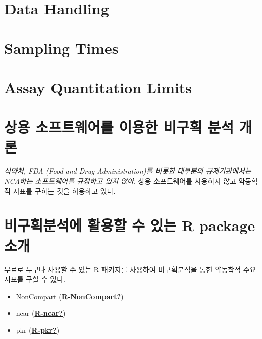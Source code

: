 \documentclass[
  11pt,
  krantz2, a4paper, twoside]{krantz}
\providecommand{\tightlist}{%
  \setlength{\itemsep}{0pt}\setlength{\parskip}{0pt}}
\begin{document}
\hypertarget{data-handling}{%
\section{Data Handling}\label{data-handling}}

\hypertarget{sampling-times}{%
\section{Sampling Times}\label{sampling-times}}

\hypertarget{assay-quantitation-limits}{%
\section{Assay Quantitation Limits}\label{assay-quantitation-limits}}

\hypertarget{uxc0c1uxc6a9-uxc18cuxd504uxd2b8uxc6e8uxc5b4uxb97c-uxc774uxc6a9uxd55c-uxbe44uxad6cuxd68d-uxbd84uxc11d-uxac1cuxb860}{%
\section{상용 소프트웨어를 이용한 비구획 분석 개론}\label{uxc0c1uxc6a9-uxc18cuxd504uxd2b8uxc6e8uxc5b4uxb97c-uxc774uxc6a9uxd55c-uxbe44uxad6cuxd68d-uxbd84uxc11d-uxac1cuxb860}}

\emph{식약처, FDA (Food and Drug Administration)를 비롯한 대부분의 규제기관에서는 NCA하는 소프트웨어를 규정하고 있지 않아}, 상용 소프트웨어를 사용하지 않고 약동학적 지표를 구하는 것을 허용하고 있다.

\hypertarget{uxbe44uxad6cuxd68duxbd84uxc11duxc5d0-uxd65cuxc6a9uxd560-uxc218-uxc788uxb294-r-package-uxc18cuxac1c}{%
\section{비구획분석에 활용할 수 있는 R package 소개}\label{uxbe44uxad6cuxd68duxbd84uxc11duxc5d0-uxd65cuxc6a9uxd560-uxc218-uxc788uxb294-r-package-uxc18cuxac1c}}

무료로 누구나 사용할 수 있는 R 패키지를 사용하여 비구획분석을 통한 약동학적 주요 지표를 구할 수 있다.

\begin{itemize}
\tightlist
\item
  NonCompart (\protect\hyperlink{ref-R-NonCompart}{\textbf{R-NonCompart?}})
\item
  ncar (\protect\hyperlink{ref-R-ncar}{\textbf{R-ncar?}})
\item
  pkr (\protect\hyperlink{ref-R-pkr}{\textbf{R-pkr?}})
\end{itemize}
\end{document}
